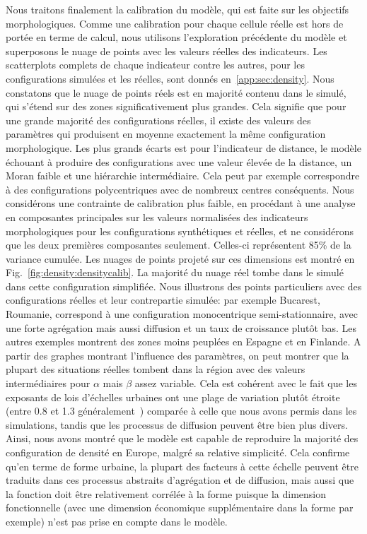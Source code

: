 {Nous traitons finalement la calibration du modèle, qui est faite sur les objectifs morphologiques. Comme une calibration pour chaque cellule réelle est hors de portée en terme de calcul, nous utilisons l'exploration précédente du modèle et superposons le nuage de points avec les valeurs réelles des indicateurs. Les scatterplots complets de chaque indicateur contre les autres, pour les configurations simulées et les réelles, sont donnés en~\ref{app:sec:density}. Nous constatons que le nuage de points réels est en majorité contenu dans le simulé, qui s'étend sur des zones significativement plus grandes. Cela signifie que pour une grande majorité des configurations réelles, il existe des valeurs des paramètres qui produisent en moyenne exactement la même configuration morphologique. Les plus grands écarts est pour l'indicateur de distance, le modèle échouant à produire des configurations avec une valeur élevée de la distance, un Moran faible et une hiérarchie intermédiaire. Cela peut par exemple correspondre à des configurations polycentriques avec de nombreux centres conséquents. Nous considérons une contrainte de calibration plus faible, en procédant à une analyse en composantes principales sur les valeurs normalisées des indicateurs morphologiques pour les configurations synthétiques et réelles, et ne considérons que les deux premières composantes seulement. Celles-ci représentent 85\% de la variance cumulée. Les nuages de points projeté sur ces dimensions est montré en Fig.~\ref{fig:density:densitycalib}. La majorité du nuage réel tombe dans le simulé dans cette configuration simplifiée. Nous illustrons des points particuliers avec des configurations réelles et leur contrepartie simulée: par exemple Bucarest, Roumanie, correspond à une configuration monocentrique semi-stationnaire, avec une forte agrégation mais aussi diffusion et un taux de croissance plutôt bas. Les autres exemples montrent des zones moins peuplées en Espagne et en Finlande. A partir des graphes montrant l'influence des paramètres, on peut montrer que la plupart des situations réelles tombent dans la région avec des valeurs intermédiaires pour $\alpha$ mais $\beta$ assez variable. Cela est cohérent avec le fait que les exposants de lois d'échelles urbaines ont une plage de variation plutôt étroite (entre 0.8 et 1.3 généralement~\cite{pumain2006evolutionary}) comparée à celle que nous avons permis dans les simulations, tandis que les processus de diffusion peuvent être bien plus divers. Ainsi, nous avons montré que le modèle est capable de reproduire la majorité des configuration de densité en Europe, malgré sa relative simplicité. Cela confirme qu'en terme de forme urbaine, la plupart des facteurs à cette échelle peuvent être traduits dans ces processus abstraits d'agrégation et de diffusion, mais aussi que la fonction doit être relativement corrélée à la forme puisque la dimension fonctionnelle (avec une dimension économique supplémentaire dans la forme par exemple) n'est pas prise en compte dans le modèle.
}


